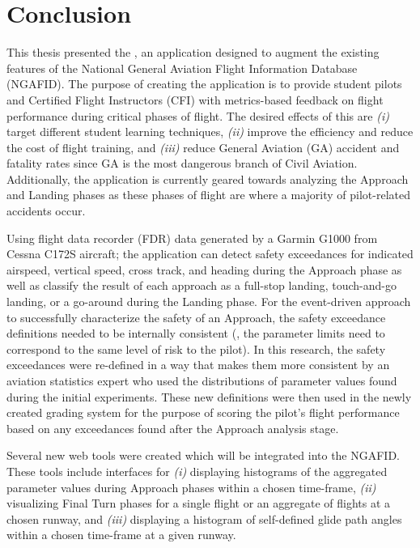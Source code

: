 
\chapter{Conclusion} \label{ch:conclusion}
	
	This thesis presented the \toolname, an application designed to augment the existing features of the National General Aviation Flight Information Database (NGAFID).  The purpose of creating the application is to provide student pilots and Certified Flight Instructors (CFI) with metrics-based feedback on flight performance during critical phases of flight.  The desired effects of this are \textit{(i)} target different student learning techniques, \textit{(ii)} improve the efficiency and reduce the cost of flight training, and \textit{(iii)} reduce General Aviation (GA) accident and fatality rates since GA is the most dangerous branch of Civil Aviation.  Additionally, the application is currently geared towards analyzing the Approach and Landing phases as these phases of flight are where a majority of pilot-related accidents occur.
	
	Using flight data recorder (FDR) data generated by a Garmin G1000 from Cessna C172S aircraft; the application can detect safety exceedances for indicated airspeed, vertical speed, cross track, and heading during the Approach phase as well as classify the result of each approach as a full-stop landing, touch-and-go landing, or a go-around during the Landing phase.  For the event-driven approach to successfully characterize the safety of an Approach, the safety exceedance definitions needed to be internally consistent (\ie, the parameter limits need to correspond to the same level of risk to the pilot).  In this research, the safety exceedances were re-defined in a way that makes them more consistent by an aviation statistics expert who used the distributions of parameter values found during the initial experiments.  These new definitions were then used in the newly created grading system for the purpose of scoring the pilot's flight performance based on any exceedances found after the Approach analysis stage.
	
	Several new web tools were created which will be integrated into the NGAFID.  These tools include interfaces for \textit{(i)} displaying histograms of the aggregated parameter values during Approach phases within a chosen time-frame, \textit{(ii)} visualizing Final Turn phases for a single flight or an aggregate of flights at a chosen runway, and \textit{(iii)} displaying a histogram of self-defined glide path angles within a chosen time-frame at a given runway.
	
